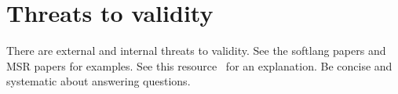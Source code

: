 \section{Threats to validity}
\label{sec:threats-to-validity}

There are external and internal threats to validity. See the softlang
papers and MSR papers for examples. See this resource~\cite{Michael04}
for an explanation. Be concise and systematic about answering
questions.
